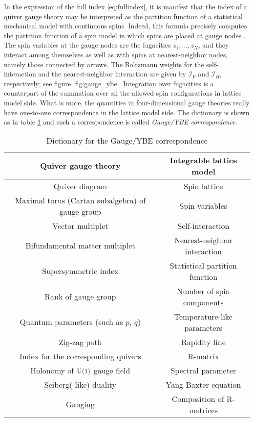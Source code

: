 In the expression of the full index \eqref{eq:fullindex},
it is manifest that the index of a quiver gauge theory may be interpreted
as the partition function of a statistical mechanical model with continuous
spins. Indeed, this formula precisely computes the partition function
of a spin model in which spins are placed at gauge nodes \cite{Yamazaki:2012cp,Yagi:2015lha}.
The spin variables at the gauge nodes are the fugacities $z_{1},\ldots,z_{N}$, and
they interact among themselves as well as with spins at nearest-neighbor
nodes, namely those connected by arrows. The Boltzmann weights for
the self-interaction and the nearest-neighbor interaction are given by $\mathcal{I}_{V}$
and $\mathcal{I}_{B}$, respectively; see figure \ref{fig:gauge_ybe}.
Integration over fugacities is a counterpart of the summation over all the
allowed spin configurations in lattice model side.
What is more, the quantities in four-dimensional gauge theories really have one-to-one
correspondence in the lattice model side. The dictionary is shown as
in table \ref{tab:gauge_ybe} and such a correspondence is called \emph{Gauge/YBE correspondence}.


\begin{table}
\caption{Dictionary for the Gauge/YBE correspondence}
\vspace{0.2cm}
  \centering
    \begin{tabular}{c|c}
Quiver gauge theory     & Integrable lattice model  \tabularnewline
\hline
\hline
Quiver diagram          & Spin lattice  \tabularnewline
Maximal torus (Cartan subalgebra) of gauge group & Spin variables  \tabularnewline
Vector multiplet        & Self-interaction  \tabularnewline
Bifundamental matter multiplet & Nearest-neighbor interaction  \tabularnewline
Supersymmetric index    & Statistical partition function  \tabularnewline
Rank of gauge group     & Number of spin components  \tabularnewline
Quantum parameters (such as $p,\,q$) & Temperature-like parameters  \tabularnewline
Zig-zag path            & Rapidity line  \tabularnewline
Index for the corresponding quivers & R-matrix   \tabularnewline
Holonomy of $\mathrm{U}(1)$ gauge field & Spectral parameter  \tabularnewline  %
Seiberg(-like) duality  & Yang-Baxter equation  \tabularnewline
Gauging                 & Composition of R-matrices   \tabularnewline
    \end{tabular}
\label{tab:gauge_ybe}
\end{table}







